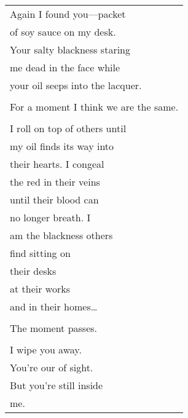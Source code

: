 \documentclass{article}
\begin{document}
\begin{center}
\begin{tabular}{l}
Again I found you---packet \\
of soy sauce on my desk. \\
Your salty blackness staring \\
me dead in the face while \\
your oil seeps into the lacquer. \\
\\
For a moment I think we are the same. \\
\\
I roll on top of others until \\
my oil finds its way into \\
their hearts. I congeal \\
the red in their veins \\
until their blood can \\
no longer breath. I \\
am the blackness others \\
find sitting on \\
their desks \\
at their works \\
and in their homes\ldots{} \\
\\
The moment passes. \\
\\
I wipe you away. \\
You're our of sight. \\
But you're still inside \\
me.
\end{tabular}
\end{center}
\end{document}
